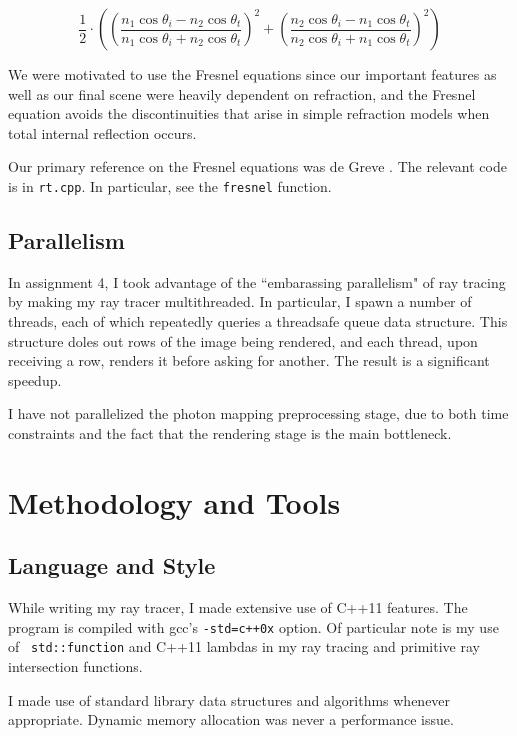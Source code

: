 \documentclass{article}
\begin{document}
$$\frac{1}{2} \cdot \left(\left(\frac{n_1 \cos\theta_i - n_2 \cos\theta_t}{n_1
\cos\theta_i + n_2\cos\theta_t}\right)^2 + \left(\frac{n_2 \cos\theta_i -
n_1\cos\theta_t}{n_2\cos\theta_i + n_1\cos\theta_t}\right)^2\right)$$

We were motivated to use the Fresnel equations since our important features as
well as our final scene were heavily dependent on refraction, and the Fresnel
equation avoids the discontinuities that arise in simple refraction models
when total internal reflection occurs.

Our primary reference on the Fresnel equations was de Greve \cite{degreve}. The
relevant code is in {\tt rt.cpp}. In particular, see the {\tt fresnel} function.

\subsection{Parallelism}

In assignment 4, I took advantage of the ``embarassing parallelism" of ray
tracing by making my ray tracer multithreaded. In particular, I spawn a number
of threads, each of which repeatedly queries a threadsafe queue data structure.
This structure doles out rows of the image being rendered, and each thread, upon
receiving a row, renders it before asking for another. The result is a
significant speedup.


I have not parallelized the photon mapping preprocessing stage, due to both time
constraints and the fact that the rendering stage is the main bottleneck.

\section{Methodology and Tools}

\subsection{Language and Style}

While writing my ray tracer, I made extensive use of C++11 features. The program
is compiled with gcc's {\tt -std=c++0x} option. Of particular note is my use of {\tt
std::function} and C++11 lambdas in my ray tracing and primitive ray intersection
functions.

I made use of standard library data structures and algorithms whenever
appropriate. Dynamic memory allocation was never a performance issue.
\end{document}
